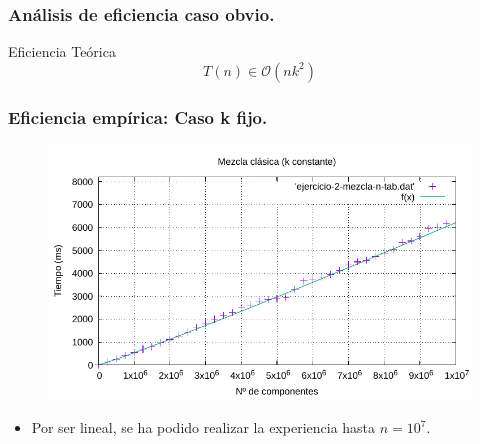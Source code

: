 \documentclass[13pt]{beamer}
\begin{document}
    \begin{frame}
		\frametitle{Análisis de eficiencia caso obvio.}
		 
		 \begin{block}{Eficiencia Teórica}
		 	$$T(n) \in \mathcal{O}(nk^{2})$$
	    \end{block}
	 
	\end{frame}

    \begin{frame}
        \frametitle{Eficiencia empírica: Caso k fijo.}

        \begin{figure}
            \centering
            \includegraphics[scale=0.76]{img/e2a-graph.pdf}
            \label{fig:2a-obvio-n-graph}
        \end{figure}

        \begin{itemize}
            \item Por ser lineal, se ha podido realizar la experiencia hasta $n=10^7$. 
        \end{itemize}
    \end{frame}
\end{document}
